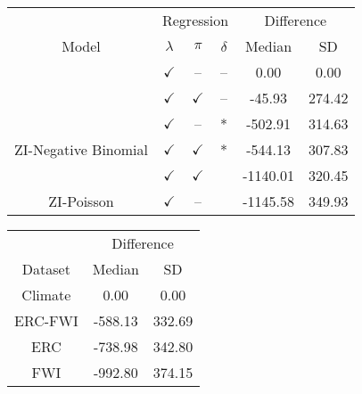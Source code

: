 \documentclass[
]{article}
\begin{document}
\begin{tabular}{cccccc}
\toprule
\multicolumn{1}{c}{ } & \multicolumn{3}{c}{Regression} & \multicolumn{2}{c}{Difference} \\
\cmidrule(l{3pt}r{3pt}){2-4} \cmidrule(l{3pt}r{3pt}){5-6}
Model & $\lambda$ & $\pi$ & $\delta$ & Median & SD\\
\midrule
 & $\checkmark$ & -- & -- & 0.00 & 0.00\\

 & $\checkmark$ & $\checkmark$ & -- & -45.93 & 274.42\\

 & $\checkmark$ & -- & * & -502.91 & 314.63\\

\multirow{-4}{*}{\centering\arraybackslash ZI-Negative Binomial} & $\checkmark$ & $\checkmark$ & * & -544.13 & 307.83\\
\cmidrule{1-6}
 & $\checkmark$ & $\checkmark$ &  & -1140.01 & 320.45\\

\multirow{-2}{*}{\centering\arraybackslash ZI-Poisson} & $\checkmark$ & -- &  & -1145.58 & 349.93\\
\bottomrule
\end{tabular}

\begin{tabular}{ccc}
\toprule
\multicolumn{1}{c}{ } & \multicolumn{2}{c}{Difference} \\
\cmidrule(l{3pt}r{3pt}){2-3}
Dataset & Median & SD\\
\midrule
Climate & 0.00 & 0.00\\
ERC-FWI & -588.13 & 332.69\\
ERC & -738.98 & 342.80\\
FWI & -992.80 & 374.15\\
\bottomrule
\end{tabular}
\end{document}
